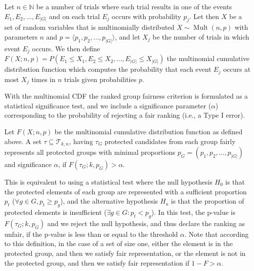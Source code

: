 \begin{definition}
	\label{def:multinomialCDF}
	Let $ n \in \mathbb{N}$ be a number of trials where each trial results in one of the events $ E_1, E_2, \ldots, E_{|G|} $ and on each trial $ E_j $ occurs with probability $ p_j $.
	Let then $X$ %
	be a set of random variables that is multinomially distributed $ X \sim \operatorname{Mult}(n, p)$ with parameters $ n $ and $ p = \langle p_1, p_2, \ldots, p_{|G|} \rangle$, and let $ X_j $ be the number of trials in which event $ E_j $ occurs.
	We then define $ F\left(X; n, p\right) = P\left(E_1 \leq X_1, E_2 \leq X_2, \ldots, E_{|G|} \leq X_{|G|}\right)$ the multinomial cumulative distribution function which computes the probability that each event $ E_j $ occurs at most $ X_j $ times in $ n $ trials given probabilities $ p $.
\end{definition}
With the multinomial CDF the ranked group fairness criterion is formulated as a statistical significance test, and we include a significance parameter ($\alpha$) corresponding to the probability of rejecting a fair ranking (i.e., a Type I error).

\begin{definition}
	\label{def:fair-representation-condition}
	Let $F(X;n,p)$ be the multinomial cumulative distribution function as defined above.
	A set $\tau \subseteq \mathcal{T}_{k,n}$, having $\tau_G$ protected candidates from each group fairly represents all protected groups with minimal proportions $p_G = (p_1, p_2, \ldots, p_{|G|})$ and significance $\alpha$,
	if $F(\tau_G;k,p_G) > \alpha$.
\end{definition}

This is equivalent to using a statistical test where the null hypothesis $H_0$ is that the protected elements of each group are represented with a sufficient proportion $p_t$ ($\forall g \in G, p_t \ge p_g$), and the alternative hypothesis $H_a$ is that the proportion of protected elements is insufficient ($\exists g \in G: p_t < p_g$). In this test, the p-value is $F(\tau_G; k, p_G)$ and we reject the null hypothesis, and thus declare the ranking as unfair, if the p-value is less than or equal to the threshold $\alpha$.
%
Note that according to this definition, in the case of a set of size one, either the element is in the protected group, and then we satisfy fair representation, or the element is not in the protected group, and then we satisfy fair representation if $1 - F > \alpha$.

